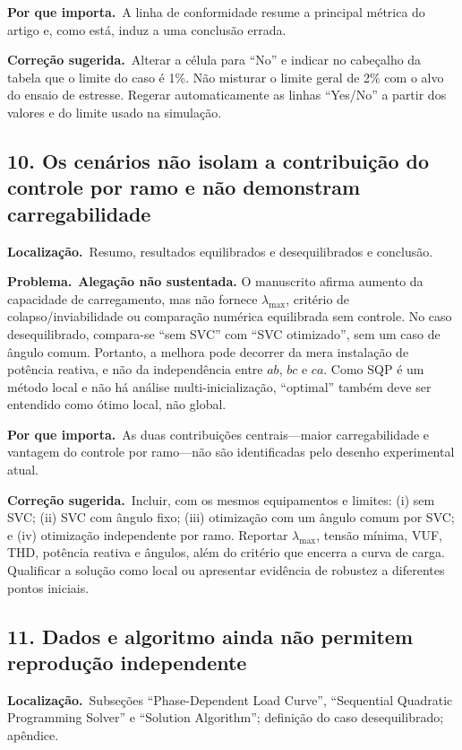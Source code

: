 \documentclass[11pt,a4paper]{article}
\newcommand{\localizacao}{\textbf{Localização.}\ }
\newcommand{\problema}{\textbf{Problema.}\ }
\newcommand{\impacto}{\textbf{Por que importa.}\ }
\newcommand{\correcao}{\textbf{Correção sugerida.}\ }
\begin{document}
\impacto A linha de conformidade resume a principal métrica do artigo e, como
está, induz a uma conclusão errada.

\correcao Alterar a célula para ``No'' e indicar no cabeçalho da tabela que o
limite do caso é 1\%. Não misturar o limite geral de 2\% com o alvo do ensaio de
estresse. Regerar automaticamente as linhas ``Yes/No'' a partir dos valores e
do limite usado na simulação.

\subsection*{10. Os cenários não isolam a contribuição do controle por ramo e não demonstram carregabilidade}

\localizacao Resumo, resultados equilibrados e desequilibrados e conclusão.

\problema \textbf{Alegação não sustentada.} O manuscrito afirma aumento da
capacidade de carregamento, mas não fornece $\lambda_{\max}$, critério de
colapso/inviabilidade ou comparação numérica equilibrada sem controle. No caso
desequilibrado, compara-se ``sem SVC'' com ``SVC otimizado'', sem um caso de
ângulo comum. Portanto, a melhora pode decorrer da mera instalação de potência
reativa, e não da independência entre $ab$, $bc$ e $ca$. Como SQP é um método
local e não há análise multi-inicialização, ``optimal'' também deve ser
entendido como ótimo local, não global.

\impacto As duas contribuições centrais---maior carregabilidade e vantagem do
controle por ramo---não são identificadas pelo desenho experimental atual.

\correcao Incluir, com os mesmos equipamentos e limites: (i) sem SVC;
(ii) SVC com ângulo fixo; (iii) otimização com um ângulo comum por SVC; e
(iv) otimização independente por ramo. Reportar $\lambda_{\max}$, tensão
mínima, VUF, THD, potência reativa e ângulos, além do critério que encerra a
curva de carga. Qualificar a solução como local ou apresentar evidência de
robustez a diferentes pontos iniciais.

\subsection*{11. Dados e algoritmo ainda não permitem reprodução independente}

\localizacao Subseções ``Phase-Dependent Load Curve'', ``Sequential
Quadratic Programming Solver'' e ``Solution Algorithm''; definição do caso
desequilibrado; apêndice.
\end{document}
